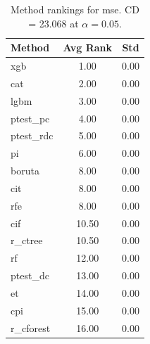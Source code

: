 \begin{table}[h]
\centering
\caption{Method rankings for mse. CD = 23.068 at $\alpha=0.05$.}
\label{tab:ranks_mse}
\begin{tabular}{lcc}
\toprule
Method & Avg Rank & Std \\
\midrule
xgb & 1.00 & 0.00 \\
cat & 2.00 & 0.00 \\
lgbm & 3.00 & 0.00 \\
ptest_pc & 4.00 & 0.00 \\
ptest_rdc & 5.00 & 0.00 \\
pi & 6.00 & 0.00 \\
boruta & 8.00 & 0.00 \\
cit & 8.00 & 0.00 \\
rfe & 8.00 & 0.00 \\
cif & 10.50 & 0.00 \\
r_ctree & 10.50 & 0.00 \\
rf & 12.00 & 0.00 \\
ptest_dc & 13.00 & 0.00 \\
et & 14.00 & 0.00 \\
cpi & 15.00 & 0.00 \\
r_cforest & 16.00 & 0.00 \\
\bottomrule
\end{tabular}
\end{table}